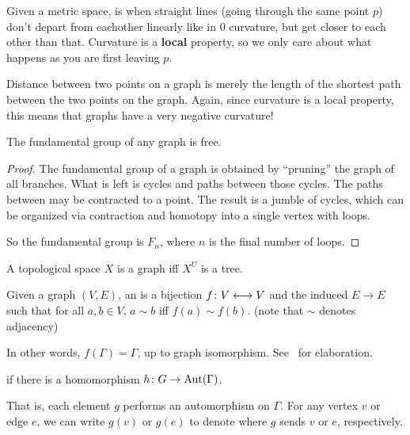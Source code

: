 \documentclass[11pt,leqno,oneside]{amsart}
\newenvironment{dateenv}{
  \vspace{1em}
}{
  \vspace{1em}
}
\newcommand{\mydate}[4]{
  \newdate{#1}{#2}{#3}{#4}
  \begin{dateenv}
    \hfill\displaydate{#1}
  \end{dateenv}
}
\numberwithin{thm}{section}
\newcommand{\adj}{\sim} %
\begin{document}
\mydate{d11}{20}{2}{2017}

\mydate{d12}{22}{2}{2017}

\begin{defn}
  Given a metric space,  is when straight lines (going through the same point $p$) don't depart from eachother linearly like in 0 curvature, but get closer to each other than that.  Curvature is a \textbf{local} property, so we only care about what happens as you are first leaving $p$.
\end{defn}

Distance between two points on a graph is merely the length of the shortest path between the two points on the graph.  Again, since curvature is a local property, this means that graphs have a very negative curvature!

\begin{thm}
  The fundamental group of any graph is free.
\end{thm}
\begin{proof}
  The fundamental group of a graph is obtained by ``pruning'' the graph of all branches.  What is left is cycles and paths between those cycles.  The paths between may be contracted to a point.  The result is a jumble of cycles, which can be organized via contraction and homotopy into a single vertex with loops.

  So the fundamental group is  $F_n$, where $n$ is the final number of loops.
\end{proof}
\begin{thm}
  A topological space $X$ is a graph iff $X^U$ is a tree.
\end{thm}
\begin{defn}
  Given a graph $(V, E)$, an  is a bijection $f \colon V \longleftrightarrow V$ and the induced $E \to E$ such that for all $a,b \in V$, $a \adj b$ iff $f(a) \adj f(b)$.  (note that $\adj$ denotes adjacency)
\end{defn}
\begin{rmk}
  In other words, $f(\Gamma) = \Gamma$, up to graph isomorphism.  See~\cite{GA} for elaboration.
\end{rmk}
\begin{defn}
   if there is a homomorphism $h \colon G \to \operatorname{Aut}(\Gamma)$.
\end{defn}
\begin{rmk}
  That is, each element $g$ performs an automorphism on $\Gamma$.  For any vertex $v$ or edge $e$, we can write $g(v)$ or $g(e)$ to denote where $g$ sends $v$ or $e$, respectively.
\end{rmk}
\end{document}
